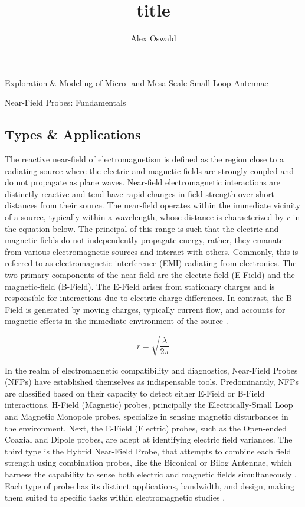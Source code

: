 \documentclass[12pt]{article}
\title{title}
\author {Alex Oswald}
\begin{document}
 
\begin{center}\Large Exploration \& Modeling of Micro- and Mesa-Scale Small-Loop Antennae \end{center}

\begin{section} {Near-Field Probes: Fundamentals}

\subsection{Types \& Applications}

The reactive near-field of electromagnetism is defined as the region close to a radiating source where the electric and magnetic fields are strongly coupled and do not propagate as plane waves. Near-field electromagnetic interactions are distinctly reactive and tend have rapid changes in field strength over short distances from their source. The near-field operates within the immediate vicinity of a source, typically within a wavelength, whose distance is characterized by $r$ in the equation below. The principal of this range is such that the electric and magnetic fields do not independently propagate energy, rather, they emanate from various electromagnetic sources and interact with others. Commonly, this is referred to as electromagnetic interference (EMI) radiating from electronics. The two primary components of the near-field are the electric-field (E-Field) and the magnetic-field (B-Field). The E-Field arises from stationary charges and is responsible for interactions due to electric charge differences. In contrast, the B-Field is generated by moving charges, typically current flow, and accounts for magnetic effects in the immediate environment of the source \cite{kanda_standard_1993}.

\[
r = \sqrt{ \frac{\lambda}{2 \pi} }
\]

In the realm of electromagnetic compatibility and diagnostics, Near-Field Probes (NFPs) have established themselves as indispensable tools. Predominantly, NFPs are classified based on their capacity to detect either E-Field or B-Field interactions. H-Field (Magnetic) probes, principally the Electrically-Small Loop and Magnetic Monopole probes, specialize in sensing magnetic disturbances in the environment. Next, the E-Field (Electric) probes, such as the Open-ended Coaxial and Dipole probes, are adept at identifying electric field variances. The third type is the Hybrid Near-Field Probe, that attempts to combine each field strength using combination probes, like the Biconical or Bilog Antennae, which harness the capability to sense both electric and magnetic fields simultaneously \cite{dyson_characteristics_1965}. Each type of probe has its distinct applications, bandwidth, and design, making them suited to specific tasks within electromagnetic studies \cite{huang_antennas_2021}.


\end{section}
\end{document}
